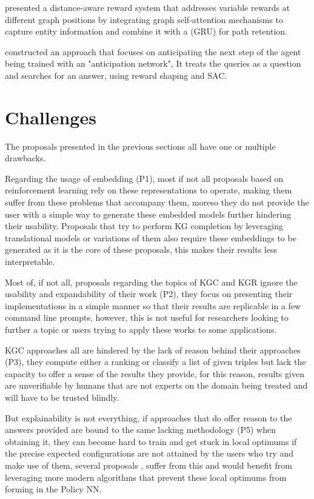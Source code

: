 \citet{tiwari2021dapath} presented a distance-aware reward system that addresses variable rewards at different graph positions by integrating graph self-attention mechanisms to capture entity information and combine it with a (GRU) for path retention.

\citet{cui2023incorporating} constructed an approach that focuses on anticipating the next step of the agent being trained with an "anticipation network", It treats the queries as a question and searches for an answer, using reward shaping and SAC.

\section{Challenges}\label{sec:moti-discussion}

The proposals presented in the previous sections all have one or multiple drawbacks.

Regarding the usage of embedding (P1), most if not all proposals based on reinforcement learning rely on these representations to operate, making them suffer from these problems that accompany them, moreso they do not provide the user with a simple way to generate these embedded models further hindering their usability. Proposals that try to perform KG completion by leveraging translational models or variations of them also require these embeddings to be generated as it is the core of these proposals, this makes their results less interpretable.

Most of, if not all, proposals regarding the topics of KGC and KGR ignore the usability and expandability of their work (P2), they focus on presenting their implementations in a simple manner so that their results are replicable in a few command line prompts, however, this is not useful for researchers looking to further a topic or users trying to apply these works to some applications.

KGC approaches \cite{nickel2011three, bordes2013translating, wang2014knowledge,vashishth2020interacte} all are hindered by the lack of reason behind their approaches (P3), they compute either a ranking or classify a list of given triples but lack the capacity to offer a sense of the results they provide, for this reason, results given are unverifiable by humans that are not experts on the domain being treated and will have to be trusted blindly.

But explainability is not everything, if approaches that do offer reason to the answers provided are bound to the same lacking methodology (P5) when obtaining it, they can become hard to train and get stuck in local optimums if the precise expected configurations are not attained by the users who try and make use of them, several proposals \cite{}, suffer from this and would benefit from leveraging more modern algorithms that prevent these local optimums from forming in the Policy NN.


